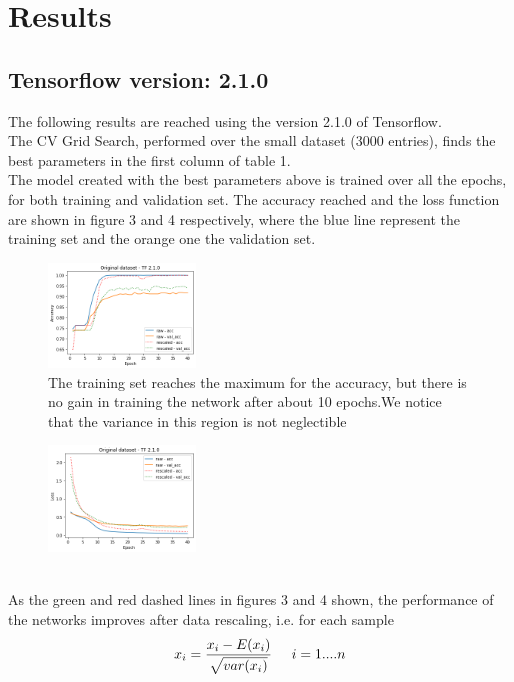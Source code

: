 \documentclass[prl,twocolumn]{revtex4-1}
\begin{document}
\section{Results}
\subsection{Tensorflow version:  2.1.0}
The following results are reached using the version 2.1.0 of Tensorflow.\\
The CV Grid Search, performed over the small dataset (3000 entries), finds the best parameters in the first column of table 1.\\
The model created with the best parameters above is trained over all the epochs, for both training and validation set. The accuracy reached and the loss function are shown in figure 3 and 4 respectively, where the blue line represent the training set and the orange one the validation set.
\begin{figure}[h]
	\includegraphics[width=0.35\textwidth]{small_newTF.png}
	\caption{The training set reaches the maximum for the accuracy, but there is no gain in training the network after about 10 epochs.We notice that the variance in this region is not neglectible}
	\label{fig:y}
\end{figure}
\begin{figure}[h!!!]
	\includegraphics[width=0.35\textwidth]{small_newTFloss.png}
	\caption{}
	\label{fig:y}
\end{figure}
\\
As the green and red dashed lines in figures 3 and 4 shown, the performance of the networks improves after data rescaling, i.e. for each sample
\begin{equation}
x_{i} = \frac{x_{i}-E(x_{i})}{\sqrt{var(x_{i})}} \hspace{0.5cm} i = 1....n
\end{equation}
\end{document}

